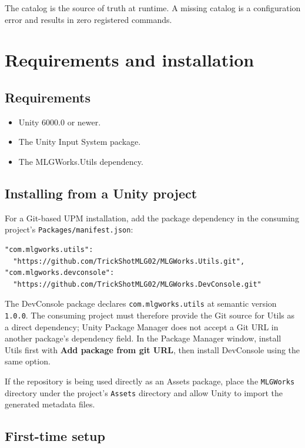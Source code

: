 \documentclass[11pt,a4paper]{article}
\begin{document}
\begin{important}
The catalog is the source of truth at runtime. A missing catalog is a configuration error and results in zero registered commands.
\end{important}

\section{Requirements and installation}

\subsection{Requirements}

\begin{itemize}[leftmargin=*]
  \item Unity 6000.0 or newer.
  \item The Unity Input System package.
  \item The MLGWorks.Utils dependency.
\end{itemize}

\subsection{Installing from a Unity project}

For a Git-based UPM installation, add the package dependency in the consuming project's \texttt{Packages/manifest.json}:

\begin{lstlisting}[style=csharp]
"com.mlgworks.utils":
  "https://github.com/TrickShotMLG02/MLGWorks.Utils.git",
"com.mlgworks.devconsole":
  "https://github.com/TrickShotMLG02/MLGWorks.DevConsole.git"
\end{lstlisting}

The DevConsole package declares \texttt{com.mlgworks.utils} at semantic
version \texttt{1.0.0}. The consuming project must therefore provide the
Git source for Utils as a direct dependency; Unity Package Manager does not
accept a Git URL in another package's dependency field. In the Package
Manager window, install Utils first with \textbf{Add package from git URL},
then install DevConsole using the same option.

If the repository is being used directly as an Assets package, place the \texttt{MLGWorks} directory under the project's \texttt{Assets} directory and allow Unity to import the generated metadata files.

\subsection{First-time setup}
\end{document}
